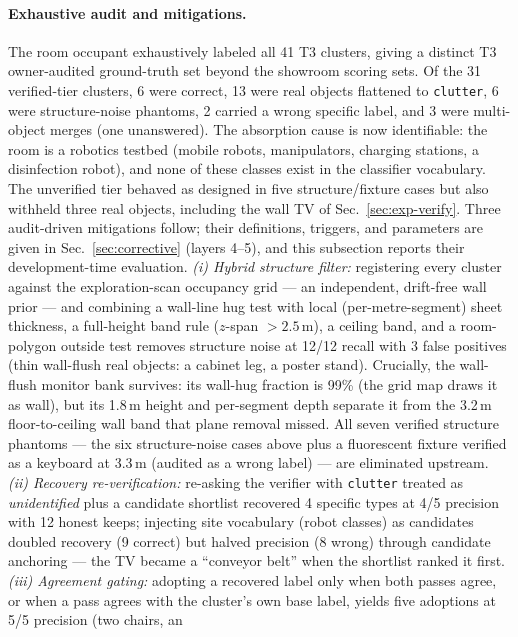 \paragraph{Exhaustive audit and mitigations.}
The room occupant exhaustively labeled all 41 T3 clusters, giving a
distinct T3 owner-audited ground-truth set beyond the showroom scoring
sets.
Of the 31 verified-tier clusters, 6 were correct, 13 were real objects
flattened to \texttt{clutter}, 6 were structure-noise phantoms, 2 carried
a wrong specific label, and 3 were multi-object merges (one unanswered).
The absorption cause is now identifiable: the room is a robotics testbed
(mobile robots, manipulators, charging stations, a disinfection robot),
and none of these classes exist in the classifier vocabulary. The
unverified tier behaved as designed in five structure/fixture cases but
also withheld three real objects, including the wall TV of
Sec.~\ref{sec:exp-verify}. Three audit-driven mitigations follow; their
definitions, triggers, and parameters are given in
Sec.~\ref{sec:corrective} (layers 4--5), and this subsection reports their
development-time evaluation.
\emph{(i) Hybrid structure filter:} registering every cluster against the
exploration-scan occupancy grid --- an independent, drift-free wall prior
--- and combining a wall-line hug test with local (per-metre-segment)
sheet thickness, a full-height band rule ($z$-span $>2.5$\,m), a ceiling
band, and a room-polygon outside test removes structure noise at 12/12
recall with 3 false positives (thin wall-flush real objects: a cabinet
leg, a poster stand). Crucially, the wall-flush monitor bank survives:
its wall-hug fraction is 99\% (the grid map draws it as wall), but its
1.8\,m height and per-segment depth separate it from the 3.2\,m
floor-to-ceiling wall band that plane removal missed. All seven verified
structure phantoms --- the six structure-noise cases above plus a
fluorescent fixture verified as a keyboard at 3.3\,m (audited as a wrong
label) --- are eliminated upstream.
\emph{(ii) Recovery re-verification:} re-asking the verifier with
\texttt{clutter} treated as \emph{unidentified} plus a candidate
shortlist recovered 4 specific types at 4/5 precision with 12 honest
keeps; injecting site vocabulary (robot classes) as candidates doubled
recovery (9 correct) but halved precision (8 wrong) through candidate
anchoring --- the TV became a ``conveyor belt'' when the shortlist ranked
it first. \emph{(iii) Agreement gating:} adopting a recovered label only
when both passes agree, or when a pass agrees with the cluster's own
base label, yields five adoptions at 5/5 precision (two chairs, an
